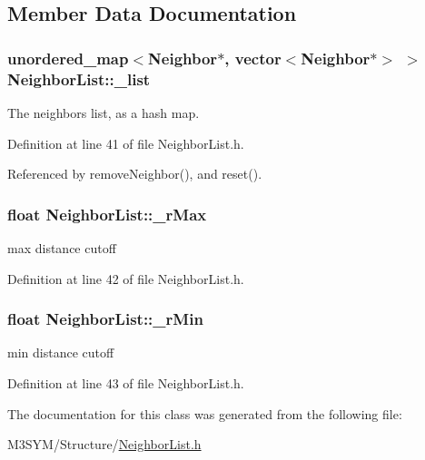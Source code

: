 \subsection{Member Data Documentation}
\hypertarget{classNeighborList_af09da5281bc352cf028e39276ba5b68f}{
\subsubsection[{\+\_\+list}]{\setlength{\rightskip}{0pt plus 5cm}unordered\+\_\+map$<${\bf Neighbor}$\ast$, vector$<${\bf Neighbor}$\ast$$>$ $>$ Neighbor\+List\+::\+\_\+list\hspace{0.3cm}{\ttfamily [protected]}}}\label{classNeighborList_af09da5281bc352cf028e39276ba5b68f}


The neighbors list, as a hash map. 



Definition at line 41 of file Neighbor\+List.\+h.



Referenced by remove\+Neighbor(), and reset().

\hypertarget{classNeighborList_a94d5215ec2f93c2191cd0ca87e062c5e}{
\subsubsection[{\+\_\+r\+Max}]{\setlength{\rightskip}{0pt plus 5cm}float Neighbor\+List\+::\+\_\+r\+Max\hspace{0.3cm}{\ttfamily [protected]}}}\label{classNeighborList_a94d5215ec2f93c2191cd0ca87e062c5e}


max distance cutoff 



Definition at line 42 of file Neighbor\+List.\+h.

\hypertarget{classNeighborList_a5fc2a03a950ca3867920527410ee8aa0}{
\subsubsection[{\+\_\+r\+Min}]{\setlength{\rightskip}{0pt plus 5cm}float Neighbor\+List\+::\+\_\+r\+Min\hspace{0.3cm}{\ttfamily [protected]}}}\label{classNeighborList_a5fc2a03a950ca3867920527410ee8aa0}


min distance cutoff 



Definition at line 43 of file Neighbor\+List.\+h.



The documentation for this class was generated from the following file\+:\begin{DoxyCompactItemize}
\item 
M3\+S\+Y\+M/\+Structure/\hyperlink{NeighborList_8h}{Neighbor\+List.\+h}\end{DoxyCompactItemize}
